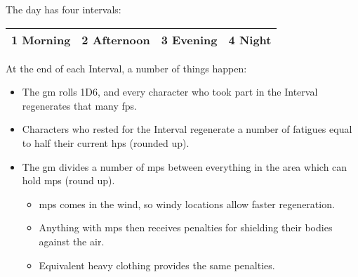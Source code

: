 The day has four intervals:

\vspace{1em}
\noindent
\begin{tabularx}{\linewidth}{c|c|c|c}

  \hline
  1 \textbf{Morning} & 2 \textbf{Afternoon} & 3 \textbf{Evening} & 4 \textbf{Night} \\
  \hline
\end{tabularx}
\vspace{1em}

At the end of each Interval, a number of things happen:

\begin{itemize}
  \item
  The \gls{gm} rolls 1D6, and every character who took part in the Interval regenerates that many \glspl{fp}.
  \item
  Characters who rested for the Interval regenerate a number of \glspl{fatigue} equal to half their current \glspl{hp} (rounded up).
  \item
  The \gls{gm} divides a number of \glspl{mp} between everything in the area which can hold \glspl{mp} (round up).
  \begin{itemize}
    \item
    \Glspl{mp} comes in the wind, so windy locations allow faster regeneration.

    \manaRegenChart
    \item
    Anything with \glspl{mp} then receives penalties for shielding their bodies against the air.

    \manaCoveringChart
    \item
    Equivalent heavy clothing provides the same penalties.
  \end{itemize}
\end{itemize}
